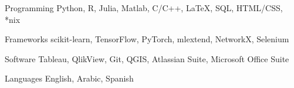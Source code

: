 


\begin{cvskills}
\cvskill
{Programming} %
{Python, R,  Julia, Matlab, C/C++, \LaTeX , SQL, HTML/CSS, *nix} %

\cvskill
{Frameworks} %
{scikit-learn, TensorFlow, PyTorch, mlextend, NetworkX, Selenium} %



\cvskill
{Software} %
{Tableau, QlikView, Git, QGIS, Atlassian Suite, Microsoft Office Suite} %


\cvskill
{Languages} %
{English, Arabic, Spanish} %


\end{cvskills}
